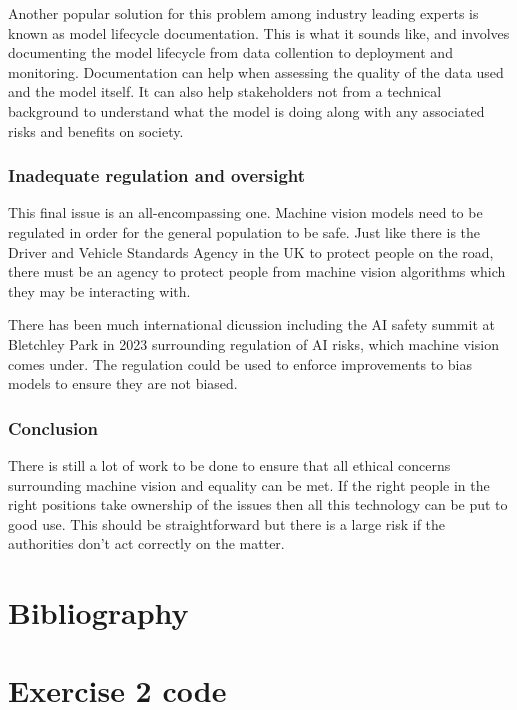 \documentclass[11pt, letterpaper]{article}
\begin{document}
Another popular solution for this problem among industry leading experts is known as model lifecycle documentation. This is what it sounds like, and involves documenting the model lifecycle from data collention to deployment and monitoring. Documentation can help when assessing the quality of the data used and the model itself. It can also help stakeholders not from a technical background to understand what the model is doing along with any associated risks and benefits on society.

\subsubsection*{Inadequate regulation and oversight}
This final issue is an all-encompassing one. Machine vision models need to be regulated in order for the general population to be safe. Just like there is the Driver and Vehicle Standards Agency in the UK to protect people on the road, there must be an agency to protect people from machine vision algorithms which they may be interacting with. 

There has been much international dicussion including the AI safety summit at Bletchley Park in 2023 \cite{AIsafetySummit} surrounding regulation of AI risks, which machine vision comes under. The regulation could be used to enforce improvements to bias models to ensure they are not biased.

\subsubsection*{Conclusion}
There is still a lot of work to be done to ensure that all ethical concerns surrounding machine vision and equality can be met. If the right people in the right positions take ownership of the issues then all this technology can be put to good use. This should be straightforward but there is a large risk if the authorities don't act correctly on the matter.

\clearpage
\section{Bibliography}
\printbibliography

\clearpage
\appendix
\section{Exercise 2 code}
\lstset{style=mystyle}

\end{document}
